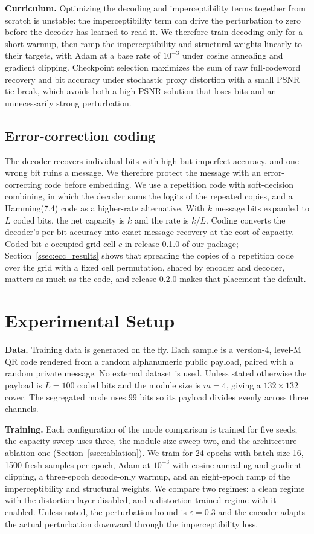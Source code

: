 \documentclass[conference]{IEEEtran}
\begin{document}
\textbf{Curriculum.} Optimizing the decoding and imperceptibility terms together from
scratch is unstable: the imperceptibility term can drive the perturbation to zero before
the decoder has learned to read it. We therefore train decoding only for a short warmup,
then ramp the imperceptibility and structural weights linearly to their targets, with
Adam at a base rate of $10^{-3}$ under cosine annealing and gradient clipping. Checkpoint
selection maximizes the sum of raw full-codeword recovery and bit accuracy under
stochastic proxy distortion with a small PSNR tie-break, which avoids both a high-PSNR
solution that loses bits and an unnecessarily strong perturbation.

\subsection{Error-correction coding}
\label{ssec:ecc}
The decoder recovers individual bits with high but imperfect accuracy, and one wrong bit
ruins a message. We therefore protect the message with an error-correcting code before
embedding. We use a repetition code with soft-decision combining, in which the decoder sums
the logits of the repeated copies, and a Hamming(7,4) code as a higher-rate alternative.
With $k$ message bits expanded to $L$ coded bits, the net capacity is $k$ and the rate is
$k/L$. Coding converts the decoder's per-bit accuracy into exact message recovery at the
cost of capacity. Coded bit $c$ occupied grid cell $c$ in release 0.1.0 of our package;
Section~\ref{ssec:ecc_results} shows that spreading the copies of a repetition code over
the grid with a fixed cell permutation, shared by encoder and decoder, matters as much as
the code, and release 0.2.0 makes that placement the default.

\section{Experimental Setup}
\textbf{Data.} Training data is generated on the fly. Each sample is a version-4,
level-M QR code rendered from a random alphanumeric public payload, paired with a random
private message. No external dataset is used. Unless stated otherwise the payload is
$L=100$ coded bits and the module size is $m=4$, giving a $132\times132$ cover. The
segregated mode uses 99 bits so its payload divides evenly across three channels.

\textbf{Training.} Each configuration of the mode comparison is trained for five seeds;
the capacity sweep uses three, the module-size sweep two, and the architecture ablation
one (Section~\ref{ssec:ablation}). We train for 24 epochs
with batch size 16, 1500 fresh samples per epoch, Adam at $10^{-3}$ with cosine
annealing and gradient clipping, a three-epoch decode-only warmup, and an eight-epoch
ramp of the imperceptibility and structural weights. We compare two regimes: a clean
regime with the distortion layer disabled, and a distortion-trained regime with it
enabled. Unless noted, the perturbation bound is $\varepsilon=0.3$ and the encoder
adapts the actual perturbation downward through the imperceptibility loss.
\end{document}
